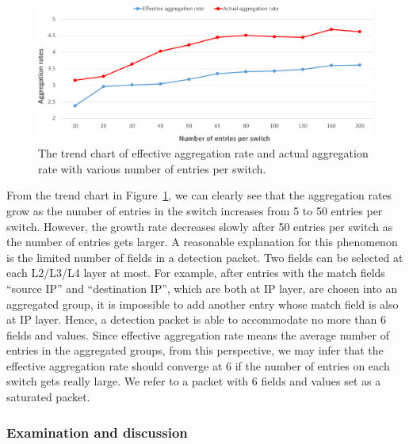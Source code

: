 \documentclass[conference]{IEEEtran}
\begin{document}
\begin{figure}[ht]
\centering
\includegraphics[width=1\linewidth]{figures/exp_entrynum_trend.pdf}
\caption{The trend chart of effective aggregation rate and actual aggregation rate with various number of entries per switch.}
\label{exp_entrynum_trend}
\end{figure}

From the trend chart in Figure~\ref{exp_entrynum_trend}, we can clearly see that the aggregation rates grow as the number of entries in the switch increases from 5 to 50 entries per switch. However, the growth rate decreases slowly after 50 entries per switch as the number of entries gets larger. A reasonable explanation for this phenomenon is the limited number of fields in a detection packet. Two fields can be selected at each L2/L3/L4 layer at most. For example, after entries with the match fields ``source IP'' and ``destination IP'', which are both at IP layer, are chosen into an aggregated group, it is impossible to add another entry whose match field is also at IP layer. Hence, a detection packet is able to accommodate no more than 6 fields and values. Since effective aggregation rate means the average number of entries in the aggregated groups, from this perspective, we may infer that the effective aggregation rate should converge at 6 if the number of entries on each switch gets really large. We refer to a packet with 6 fields and values set as a saturated packet.

\subsubsection{Examination and discussion}
\label{examination_and_discussion}
\end{document}

